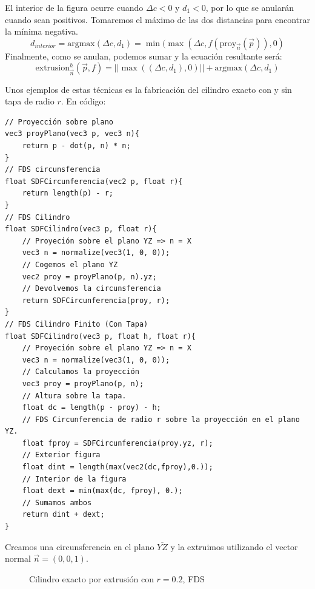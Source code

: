 El interior de la figura ocurre cuando \(\Delta c < 0\) y \(d_1 < 0\), por lo que se anularán cuando sean positivos. Tomaremos el máximo de las dos distancias para encontrar la mínima negativa.
\[d_{interior} = \text{argmax}(\Delta c, d_1) = \min(\max(\Delta c, f(\text{proy}_{\Vec{n}}(\Vec{p})), 0)\]
Finalmente, como se anulan, podemos sumar y la ecuación resultante será:
\[\text{extrusion}^h_{\Vec{n}}\left(\Vec{p},f\right)=\vert\vert \max((\Delta c, d_1), 0)\vert\vert +  \text{argmax}(\Delta c, d_1) \]

Unos ejemplos de estas técnicas es la fabricación del cilindro exacto con y sin tapa de radio \(r\). En código:
\begin{lstlisting}
// Proyección sobre plano
vec3 proyPlano(vec3 p, vec3 n){
    return p - dot(p, n) * n;
}
// FDS circunsferencia
float SDFCircunferencia(vec2 p, float r){
	return length(p) - r;
}
// FDS Cilindro
float SDFCilindro(vec3 p, float r){
    // Proyeción sobre el plano YZ => n = X
    vec3 n = normalize(vec3(1, 0, 0));
    // Cogemos el plano YZ
    vec2 proy = proyPlano(p, n).yz;
    // Devolvemos la circunsferencia
    return SDFCircunferencia(proy, r);
}
// FDS Cilindro Finito (Con Tapa)
float SDFCilindro(vec3 p, float h, float r){
    // Proyeción sobre el plano YZ => n = X
    vec3 n = normalize(vec3(1, 0, 0));
    // Calculamos la proyección
    vec3 proy = proyPlano(p, n);
    // Altura sobre la tapa.
    float dc = length(p - proy) - h;
    // FDS Circunferencia de radio r sobre la proyección en el plano YZ.
    float fproy = SDFCircunferencia(proy.yz, r);
    // Exterior figura
    float dint = length(max(vec2(dc,fproy),0.));
    // Interior de la figura
    float dext = min(max(dc, fproy), 0.);
    // Sumamos ambos
    return dint + dext;
}
\end{lstlisting}

Creamos una circunsferencia en el plano \(\overline{YZ}\) y la extruimos utilizando el vector normal \(\Vec{n}=(0,0,1)\).

\begin{figure}[H]
  \centering
  \captionsetup{justification=centering}%
  \hfill
  \caption{Cilindro exacto por extrusión con \(r=0.2\), FDS}
  \label{fig:cilindros}
\end{figure}

